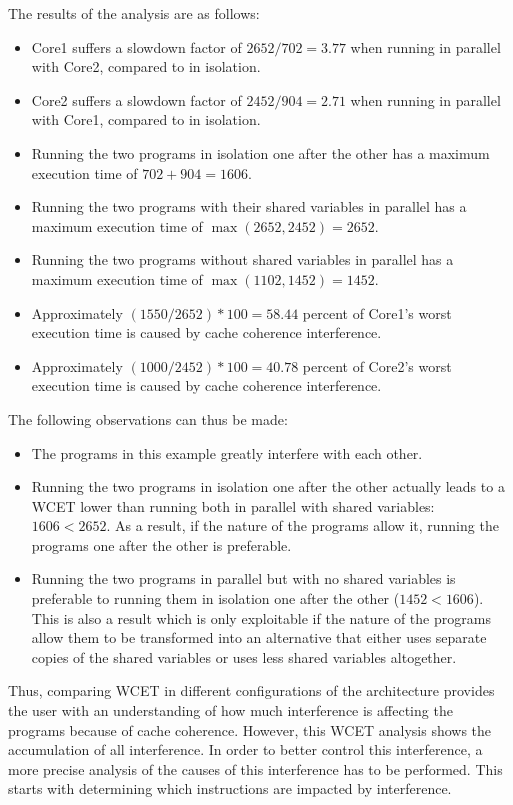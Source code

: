 \begin{example}
The results of the analysis are as follows:
\begin{itemize}
\item
   Core1 suffers a slowdown factor of $2652/702 = 3.77$ when running in
   parallel with Core2, compared to in isolation.
\item
   Core2 suffers a slowdown factor of $2452/904 = 2.71$ when running in
   parallel with Core1, compared to in isolation.
\item
   Running the two programs in isolation one after the other has a maximum
   execution time of $702 + 904 = 1606$.
\item
   Running the two programs with their shared variables in parallel has a
   maximum execution time of $\max(2652, 2452) = 2652$.
\item
   Running the two programs without shared variables in parallel has a
   maximum execution time of $\max(1102, 1452) = 1452$.
\item
   Approximately $(1550/2652)*100=58.44$ percent of Core1's worst execution time
   is caused by cache coherence interference.
\item
   Approximately $(1000/2452)*100=40.78$ percent of Core2's worst execution time
   is caused by cache coherence interference.
\end{itemize}

The following observations can thus be made:
\begin{itemize}
\item The programs in this example greatly interfere with each other.
\item
   Running the two programs in isolation one after the other actually leads to
   a WCET lower than running both in parallel with shared variables:
   $1606 < 2652$. As a result, if the nature of the programs allow it, running
   the programs one after the other is preferable.
\item
   Running the two programs in parallel but with no shared variables is
   preferable to running them in isolation one after the other ($1452 < 1606$).
   This is also a result which is only exploitable if the nature of the programs
   allow them to be transformed into an alternative that either uses separate
   copies of the shared variables or uses less shared variables altogether.
\end{itemize}
\end{example}

Thus, comparing WCET in different configurations of the architecture provides
the user with an understanding of how much interference is affecting the
programs because of cache coherence. However, this WCET analysis shows the
accumulation of all interference. In order to better control this interference,
a more precise analysis of the causes of this interference has to be performed.
This starts with determining which instructions are impacted by interference.
